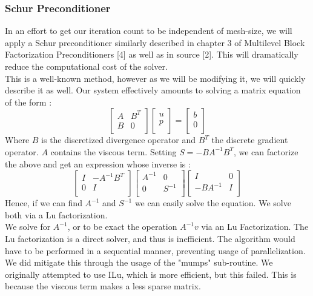\documentclass[11pt,twoside,a4paper]{article}
\begin{document}
\subsubsection{Schur Preconditioner}
In an effort to get our iteration count to be independent of mesh-size, we will apply a Schur preconditioner similarly described in chapter 3 of Multilevel Block Factorization Preconditioners [4] as well as in source [2]. This will dramatically reduce the computational cost of the solver.\\
This is a well-known method, however as we will be modifying it, we will quickly describe it as well.
Our system effectively amounts to solving a matrix equation of the form :
$$
\begin{bmatrix}
A         & B^{T}\\
B         & 0 \\
\end{bmatrix}
\begin{bmatrix}
u    \\
p     \\
\end{bmatrix}
=
\begin{bmatrix}
b    \\
0     \\
\end{bmatrix}
$$
Where $B$ is the discretized divergence operator and $B^T$ the discrete gradient operator. $A$ contains the viscous term.
Setting $S = - B A^{-1} B^{T}$, we can factorize the above and get an expression whose inverse is :
$$
\begin{bmatrix}
I         & - A^{-1} B^{T}\\
0         & I \\
\end{bmatrix}
\begin{bmatrix}
A^{-1}   & 0\\
0       & S^{-1} \\
\end{bmatrix}
\begin{bmatrix}
I & 0\\
 - B A^{-1}       & I \\
\end{bmatrix}
$$
Hence, if we can find $A^{-1}$ and $S^{-1}$ we can easily solve the equation. We solve both via a Lu factorization.\\
We solve for $A^{-1}$, or to be exact the operation $A^{-1}v$ via an Lu Factorization. The Lu factorization is a direct solver, and thus is inefficient. The algorithm would have to be performed in a sequential manner, preventing usage of parallelization. We did mitigate this through the usage of the "mumps" sub-routine. We originally attempted to use ILu, which is more efficient, but this failed. This is because the viscous term makes a less sparse matrix.\\
\end{document}
